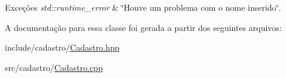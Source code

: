 \begin{DoxyExceptions}{Exceções}
{\em std\+::runtime\+\_\+error} & \char`\"{}\+Houve um problema com o nome inserido\char`\"{}. \\
\hline
\end{DoxyExceptions}


A documentação para essa classe foi gerada a partir dos seguintes arquivos\+:\begin{DoxyCompactItemize}
\item 
include/cadastro/\mbox{\hyperlink{_cadastro_8hpp}{Cadastro.\+hpp}}\item 
src/cadastro/\mbox{\hyperlink{_cadastro_8cpp}{Cadastro.\+cpp}}\end{DoxyCompactItemize}
